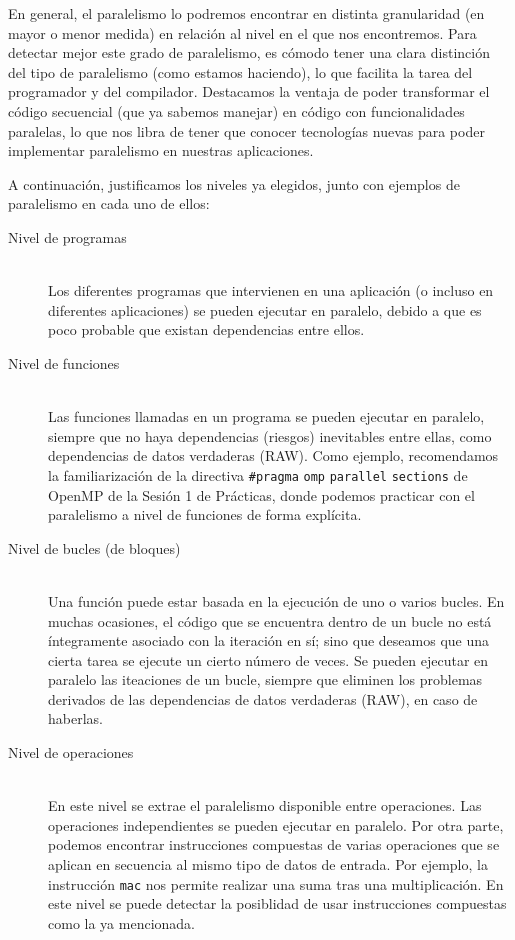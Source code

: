 En general, el paralelismo lo podremos encontrar en distinta granularidad (en mayor o menor medida) en relación al nivel en el que nos encontremos. Para detectar mejor este grado de paralelismo, es cómodo tener una clara distinción del tipo de paralelismo (como estamos haciendo), lo que facilita la tarea del programador y del compilador. Destacamos la ventaja de poder transformar el código secuencial (que ya sabemos manejar) en código con funcionalidades paralelas, lo que nos libra de tener que conocer tecnologías nuevas para poder implementar paralelismo en nuestras aplicaciones.

A continuación, justificamos los niveles ya elegidos, junto con ejemplos de paralelismo en cada uno de ellos:
\begin{description}
    \item [Nivel de programas]~\\
        Los diferentes programas que intervienen en una aplicación (o incluso en diferentes aplicaciones) se pueden ejecutar en paralelo, debido a que es poco probable que existan dependencias entre ellos.
    \item [Nivel de funciones]~\\
    Las funciones llamadas en un programa se pueden ejecutar en paralelo, siempre que no haya dependencias (riesgos) inevitables entre ellas, como dependencias de datos verdaderas (RAW). Como ejemplo, recomendamos la familiarización de la directiva \verb|#pragma| \verb|omp| \verb|parallel| \verb|sections| de OpenMP de la Sesión 1 de Prácticas, donde podemos practicar con el paralelismo a nivel de funciones de forma explícita.
    \item [Nivel de bucles (de bloques)]~\\
        Una función puede estar basada en la ejecución de uno o varios bucles. En muchas ocasiones, el código que se encuentra dentro de un bucle no está íntegramente asociado con la iteración en sí; sino que deseamos que una cierta tarea se ejecute un cierto número de veces. Se pueden ejecutar en paralelo las iteaciones de un bucle, siempre que eliminen los problemas derivados de las dependencias de datos verdaderas (RAW), en caso de haberlas.
    \item [Nivel de operaciones]~\\
        En este nivel se extrae el paralelismo disponible entre operaciones. Las operaciones independientes se pueden ejecutar en paralelo. Por otra parte, podemos encontrar instrucciones compuestas de varias operaciones que se aplican en secuencia al mismo tipo de datos de entrada. Por ejemplo, la instrucción \verb|mac| nos permite realizar una suma tras una multiplicación. En este nivel se puede detectar la posiblidad de usar instrucciones compuestas como la ya mencionada.
\end{description}

